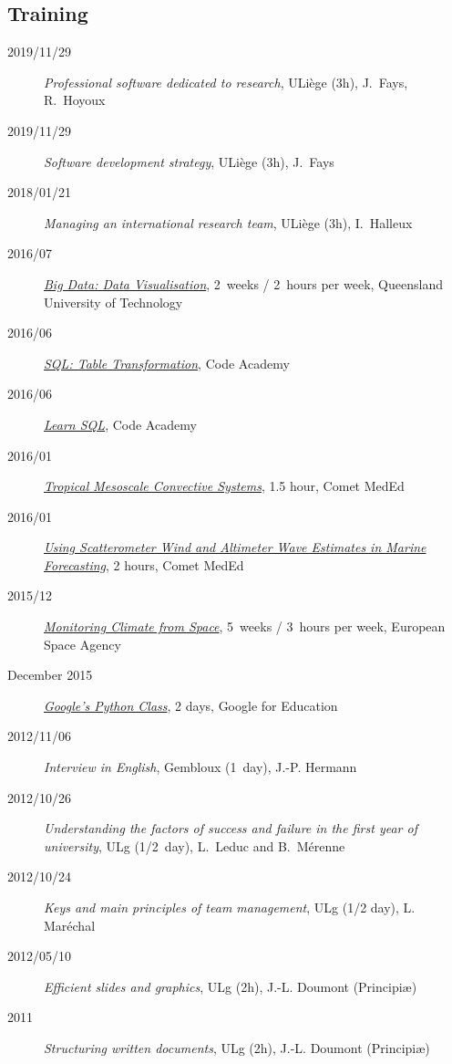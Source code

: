 \documentclass[10pt,a4paper,svgnames]{article}
\begin{document}
\subsection{Training}

\begin{description}
\item[2019/11/29]{\textit{Professional software dedicated to research}, ULiège (3h), J.~Fays, R.~Hoyoux}
\item[2019/11/29]{\textit{Software development strategy}, ULiège (3h), J.~Fays}
\item[2018/01/21]{\textit{Managing an international research team}, ULiège (3h), I.~Halleux}
\item[2016/07]{\href{https://www.futurelearn.com/courses/big-data-visualisation}{\textit{Big Data: Data Visualisation}}, 2~weeks / 2~hours per week, Queensland University of Technology}
\item[2016/06]{\href{https://www.codecademy.com/learn/sql-table-transformation}{\textit{SQL: Table Transformation}}, Code Academy}
\item[2016/06]{\href{https://www.codecademy.com/learn/learn-sql}{\textit{Learn SQL}}, Code Academy}
\item[2016/01]{\href{https://www.meted.ucar.edu/training_module.php?id=993}{\textit{Tropical Mesoscale Convective Systems}}, 1.5 hour, Comet MedEd}
\item[2016/01]{\href{https://www.meted.ucar.edu/training_module.php?id=1093}{\textit{Using Scatterometer Wind and Altimeter Wave Estimates in Marine Forecasting}}, 2 hours, Comet MedEd}
\item[2015/12]{\href{https://www.futurelearn.com/courses/climate-from-space}{\textit{Monitoring Climate from Space}}, 5~weeks / 3~hours per week, European Space Agency}
\item[December 2015]{\href{https://developers.google.com/edu/python/?hl=en}{\textit{Google's Python Class}}, 2 days, Google for Education}
\item[2012/11/06]{\textit{Interview in English}, Gembloux (1~day), J.-P. Hermann}
\item[2012/10/26]{\textit{Understanding the factors of success and failure in the first year of university}, ULg (1/2~day), L.~Leduc and B.~M\'{e}renne}
\item[2012/10/24]{\textit{Keys and main principles of team management}, ULg  (1/2 day), L. Mar\'{e}chal}
\item[2012/05/10]{\textit{Efficient slides and graphics}, ULg (2h), J.-L. Doumont (Principi\ae)}

\item[2011]{\textit{Structuring written documents}, ULg (2h), J.-L. Doumont (Principi\ae)}
\end{description}
\end{document}
